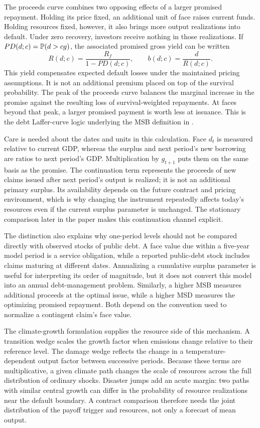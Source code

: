 The proceeds curve combines two opposing effects of a larger promised repayment. Holding its price fixed, an additional unit of face raises current funds. Holding resources fixed, however, it also brings more output realizations into default. Under zero recovery, investors receive nothing in those realizations. If $PD(d;c)=\mathbb P(d>cg)$, the associated promised gross yield can be written
\begin{equation}\label{eq:promised_yield_exposition}
 R(d;c)=\frac{R_f}{1-PD(d;c)},\qquad b(d;c)=\frac{d}{R(d;c)}.
\end{equation}
This yield compensates expected default losses under the maintained pricing assumptions. It is not an additional premium placed on top of the survival probability. The peak of the proceeds curve balances the marginal increase in the promise against the resulting loss of survival-weighted repayments. At faces beyond that peak, a larger promised payment is worth less at issuance. This is the debt Laffer-curve logic underlying the MSB definition in \textcite{CollardEtAl2015}.

Care is needed about the dates and units in this calculation. Face $d_t$ is measured relative to current GDP, whereas the surplus and next period's new borrowing are ratios to next period's GDP. Multiplication by $g_{t+1}$ puts them on the same basis as the promise. The continuation term represents the proceeds of new claims issued after next period's output is realized; it is not an additional primary surplus. Its availability depends on the future contract and pricing environment, which is why changing the instrument repeatedly affects today's resources even if the current surplus parameter is unchanged. The stationary comparison later in the paper makes this continuation channel explicit.

The distinction also explains why one-period levels should not be compared directly with observed stocks of public debt. A face value due within a five-year model period is a service obligation, while a reported public-debt stock includes claims maturing at different dates. Annualizing a cumulative surplus parameter is useful for interpreting its order of magnitude, but it does not convert this model into an annual debt-management problem. Similarly, a higher MSB measures additional proceeds at the optimal issue, while a higher MSD measures the optimizing promised repayment. Both depend on the convention used to normalize a contingent claim's face value.

The climate-growth formulation supplies the resource side of this mechanism. A transition wedge scales the growth factor when emissions change relative to their reference level. The damage wedge reflects the change in a temperature-dependent output factor between successive periods. Because these terms are multiplicative, a given climate path changes the scale of resources across the full distribution of ordinary shocks. Disaster jumps add an acute margin: two paths with similar central growth can differ in the probability of resource realizations near the default boundary. A contract comparison therefore needs the joint distribution of the payoff trigger and resources, not only a forecast of mean output.

